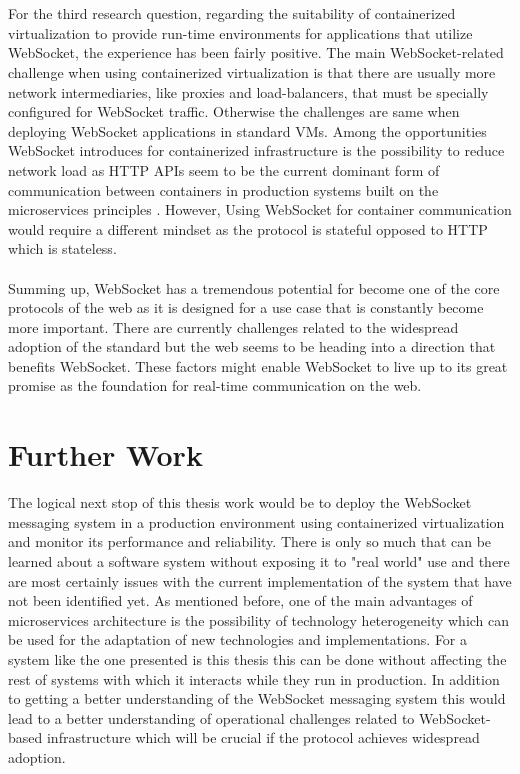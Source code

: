\\ \\
For the third research question, regarding the suitability of containerized virtualization to provide run-time environments for applications that utilize WebSocket, the experience has been fairly positive. The main WebSocket-related challenge when using containerized virtualization is that there are usually more network intermediaries, like proxies and load-balancers, that must be specially configured for WebSocket traffic. Otherwise the challenges are same when deploying WebSocket applications in standard VMs. Among the opportunities WebSocket introduces for containerized infrastructure is the possibility to reduce network load as HTTP APIs seem to be the current dominant form of communication between containers in production systems built on the microservices principles \cite{fowlervMicroservices}. However, Using WebSocket for container communication would require a different mindset as the protocol is stateful opposed to HTTP which is stateless.
\\ \\
Summing up, WebSocket has a tremendous potential for become one of the core protocols of the web as it is designed for a use case that is constantly become more important. There are currently challenges related to the widespread adoption of the standard but the web seems to be heading into a direction that benefits WebSocket. These factors might enable WebSocket to live up to its great promise as the foundation for real-time communication on the web.

\section{Further Work}

The logical next stop of this thesis work would be to deploy the WebSocket messaging system in a production environment using containerized virtualization and monitor its performance and reliability. There is only so much that can be learned about a software system without exposing it to "real world" use and there are most certainly issues with the current implementation of the system that have not been identified yet. As mentioned before, one of the main advantages of microservices architecture is the possibility of technology heterogeneity which can be used for the adaptation of new technologies and implementations. For a system like the one presented is this thesis this can be done without affecting the rest of systems with which it interacts while they run in production. In addition to getting a better understanding of the WebSocket messaging system this would lead to a better understanding of operational challenges related to WebSocket-based infrastructure which will be crucial if the protocol achieves widespread adoption. 